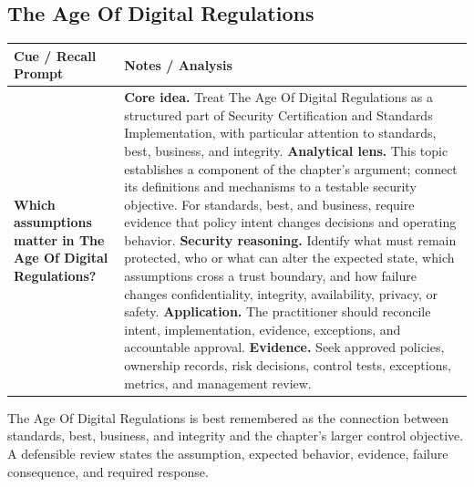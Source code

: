 \documentclass[11pt]{article}
\newcommand{\CornellHeader}{%
\rowcolor{Navy}\color{white}\bfseries Cue / Recall Prompt & \color{white}\bfseries Notes / Analysis\\\hline}
\newcommand{\CornellRow}[2]{%
\cellcolor{CueGray}\RaggedRight\textbf{#1} & \RaggedRight #2\\\hline}
\begin{document}
\subsection*{The Age Of Digital Regulations}
\begin{longtable}{>{\RaggedRight\arraybackslash}p{}|>{\RaggedRight\arraybackslash}p{}}
\CornellHeader
\CornellRow{Which assumptions matter in The Age Of Digital Regulations?}{\textbf{Core idea.} Treat The Age Of Digital Regulations as a structured part of Security Certification and Standards Implementation, with particular attention to standards, best, business, and integrity. \textbf{Analytical lens.} This topic establishes a component of the chapter's argument; connect its definitions and mechanisms to a testable security objective. For standards, best, and business, require evidence that policy intent changes decisions and operating behavior. \textbf{Security reasoning.} Identify what must remain protected, who or what can alter the expected state, which assumptions cross a trust boundary, and how failure changes confidentiality, integrity, availability, privacy, or safety. \textbf{Application.} The practitioner should reconcile intent, implementation, evidence, exceptions, and accountable approval. \textbf{Evidence.} Seek approved policies, ownership records, risk decisions, control tests, exceptions, metrics, and management review.}
\end{longtable}
\begin{topicsummary}
The Age Of Digital Regulations is best remembered as the connection between standards, best, business, and integrity and the chapter's larger control objective. A defensible review states the assumption, expected behavior, evidence, failure consequence, and required response.
\end{topicsummary}
\end{document}
